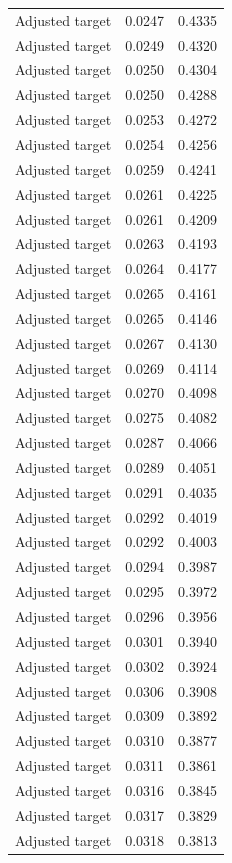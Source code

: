 \begin{table}[htbp]
\begin{tabular}{lll}
Adjusted target & 0.0247 & 0.4335 \\
Adjusted target & 0.0249 & 0.4320 \\
Adjusted target & 0.0250 & 0.4304 \\
Adjusted target & 0.0250 & 0.4288 \\
Adjusted target & 0.0253 & 0.4272 \\
Adjusted target & 0.0254 & 0.4256 \\
Adjusted target & 0.0259 & 0.4241 \\
Adjusted target & 0.0261 & 0.4225 \\
Adjusted target & 0.0261 & 0.4209 \\
Adjusted target & 0.0263 & 0.4193 \\
Adjusted target & 0.0264 & 0.4177 \\
Adjusted target & 0.0265 & 0.4161 \\
Adjusted target & 0.0265 & 0.4146 \\
Adjusted target & 0.0267 & 0.4130 \\
Adjusted target & 0.0269 & 0.4114 \\
Adjusted target & 0.0270 & 0.4098 \\
Adjusted target & 0.0275 & 0.4082 \\
Adjusted target & 0.0287 & 0.4066 \\
Adjusted target & 0.0289 & 0.4051 \\
Adjusted target & 0.0291 & 0.4035 \\
Adjusted target & 0.0292 & 0.4019 \\
Adjusted target & 0.0292 & 0.4003 \\
Adjusted target & 0.0294 & 0.3987 \\
Adjusted target & 0.0295 & 0.3972 \\
Adjusted target & 0.0296 & 0.3956 \\
Adjusted target & 0.0301 & 0.3940 \\
Adjusted target & 0.0302 & 0.3924 \\
Adjusted target & 0.0306 & 0.3908 \\
Adjusted target & 0.0309 & 0.3892 \\
Adjusted target & 0.0310 & 0.3877 \\
Adjusted target & 0.0311 & 0.3861 \\
Adjusted target & 0.0316 & 0.3845 \\
Adjusted target & 0.0317 & 0.3829 \\
Adjusted target & 0.0318 & 0.3813 \\

\end{tabular}
\end{table}
